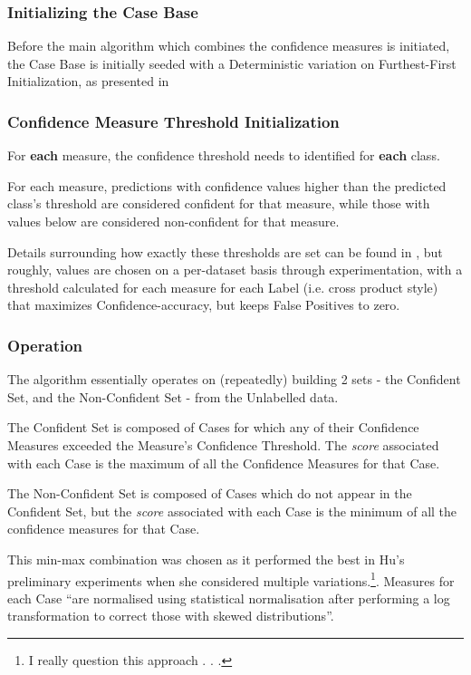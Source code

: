 \documentclass[a4paper,11pt]{report}
\begin{document}
\subsubsection{Initializing the Case Base}
Before the main algorithm which combines the confidence measures is initiated, the Case Base is initially seeded with a Deterministic variation on Furthest-First Initialization, as presented in \citet{Greene2007}

\subsubsection{Confidence Measure Threshold Initialization}
For \textbf{each} measure, the confidence threshold needs to identified for \textbf{each} class.

For each measure, predictions with confidence values higher than the predicted class's threshold are considered confident for that measure, while those with values below are considered non-confident for that measure.

Details surrounding how exactly these thresholds are set can be found in \citet{Delany2005}, but roughly, values are chosen on a per-dataset basis through experimentation, with a threshold calculated for each measure for each Label (i.e. cross product style) that maximizes Confidence-accuracy, but keeps False Positives to zero.

\subsubsection{Operation}
The algorithm essentially operates on (repeatedly) building 2 sets - the Confident Set, and the Non-Confident Set - from the Unlabelled data.

The Confident Set is composed of Cases for which any of their Confidence Measures exceeded the Measure's Confidence Threshold. The \emph{score} associated with each Case is the maximum of all the Confidence Measures for that Case.

The Non-Confident Set is composed of Cases which do not appear in the Confident Set, but the \emph{score} associated with each Case is the minimum of all the confidence measures for that Case. 

This min-max combination was chosen as it performed the best in Hu's preliminary experiments when she considered multiple variations.\footnote{I really question this approach . . .}. Measures for each Case ``are normalised using statistical normalisation after performing a log transformation to correct those with skewed distributions''\citep{Hu2011}.
\end{document}
